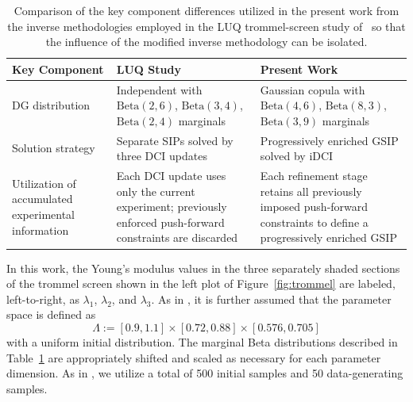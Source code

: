 \documentclass{article}
\newcommand{\pspace}{\Lambda}
\begin{document}
\begin{table}[ht]
\centering
\caption{Comparison of the key component differences utilized in the present work from the inverse methodologies employed in the LUQ trommel-screen study of~\cite{RHB25} so that the influence of the modified inverse methodology can be isolated.}
\label{tab:trommel_comparison}

\begin{tabular}{p{4.0cm}p{5.0cm}p{5.6cm}}
\toprule
\textbf{Key Component} &
\textbf{LUQ Study~\cite{RHB25}} &
\textbf{Present Work} \\
\midrule

DG distribution &
Independent with
$\mathrm{Beta}(2,6)$,
$\mathrm{Beta}(3,4)$,
$\mathrm{Beta}(2,4)$
marginals &
Gaussian copula with $\mathrm{Beta}(4,6)$,
$\mathrm{Beta}(8,3)$,
$\mathrm{Beta}(3,9)$
marginals \\
\hline

Solution strategy &
Separate SIPs solved by three DCI updates &
Progressively enriched GSIP solved by iDCI \\
\hline

{Utilization of accumulated experimental information} &
{Each DCI update uses only the current experiment; previously enforced push-forward constraints are discarded} &
{Each refinement stage retains all previously imposed push-forward constraints to define a progressively enriched GSIP} \\
\bottomrule
\end{tabular}
\end{table}

In this work, the Young's modulus values in the three separately shaded sections of the trommel screen shown in the left plot of Figure~\ref{fig:trommel} are labeled, left-to-right, as $\lambda_1$, $\lambda_2$, and $\lambda_3$.
As in \cite{RHB25}, it is further assumed that the parameter space is defined as
\[
    \pspace := [0.9,1.1]\times[0.72,0.88]\times[0.576, 0.705]
\]
with a uniform initial distribution.
The marginal Beta distributions described in Table~\ref{tab:trommel_comparison} are appropriately shifted and scaled as necessary for each parameter dimension.
As in \cite{RHB25}, we utilize a total of 500 initial samples and 50 data-generating samples.
\end{document}
